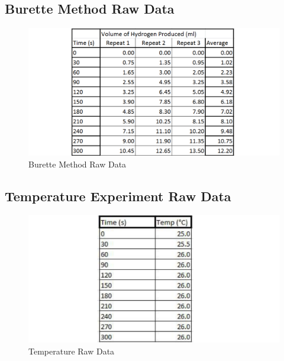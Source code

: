 \subsection{Burette Method Raw Data}

\begin{figure}[H]
    \includegraphics[width=\textwidth]{./preliminarywork/images/BuretteRawData.pdf}
    \caption{Burette Method Raw Data} \label{fig:BuretteRawData}
\end{figure}

\subsection{Temperature Experiment Raw Data}\begin{figure}[H]
    \includegraphics[width=\textwidth]{./preliminarywork/images/TemperatureRawData.pdf}
    \caption{Temperature Raw Data} \label{fig:TemperatureRawData}
\end{figure}

	